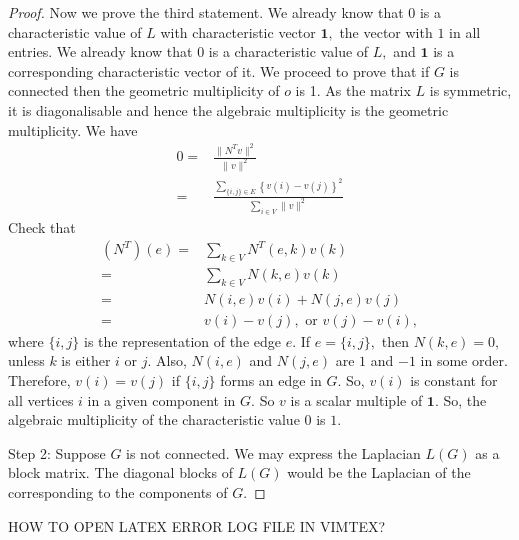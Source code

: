 \begin{proof}
Now we prove the third statement. We already know that $0$ is a 
characteristic value of $L$ with characteristic vector $\mathbf{1},$
the vector with $1$ in all entries.
We already know that $0$ is a characteristic value of $L,$ and 
$\mathbf{1}$ is a corresponding characteristic vector of it.
We proceed to prove that if $G$ is connected then the geometric
multiplicity of $o$ is 1. As the matrix $L$ is symmetric, it is 
diagonalisable and hence the algebraic multiplicity is the
geometric multiplicity. We have
\begin{align*}
	0 = {}& \frac{\lVert N^T v  \rVert^2}{\lVert v \rVert^2} \\
	={}& \frac{\sum_{ \{i,j \} \in E} \left\{ v(i) - v(j) \right\} ^{2}}
	{\sum_{i \in V} \lVert v \rVert^2} 
\end{align*}
Check that
\begin{align*}
	(N^T)(e) ={}& \sum_{k \in V} N^T(e,k) v(k) \\
	={}& \sum_{k \in V}  N(k,e) v(k) \\
	={}& N(i, e) v(i) + N(j,e) v(j) \\
	={}& v(i) - v(j), \text{ or } v(j) - v(i),
\end{align*}
where $\{i,j\}$ is the representation of the edge $e.$
If $e = \{ i,j\},$ then $N(k,e) = 0,$ unless $k$ is either $i$ or $j.$
Also, $N(i,e)$ and $N(j,e)$ are $1$ and $-1$ in some order.
Therefore, $v(i) = v(j)$ if $\{i,j\}$ forms an edge in $G.$
So, $v(i)$ is constant for all vertices $i$ in a given component
in $G.$ So $v$ is a scalar multiple of $\mathbf{1}.$ So, the algebraic
multiplicity of the characteristic value $0$ is $1.$

Step 2: Suppose $G$ is not connected. We may express the Laplacian $L(G)$
as a block matrix. The diagonal blocks of $L(G)$ would be the Laplacian
of the corresponding to the components of $G.$

\end{proof}


HOW TO OPEN LATEX ERROR LOG FILE IN VIMTEX?
